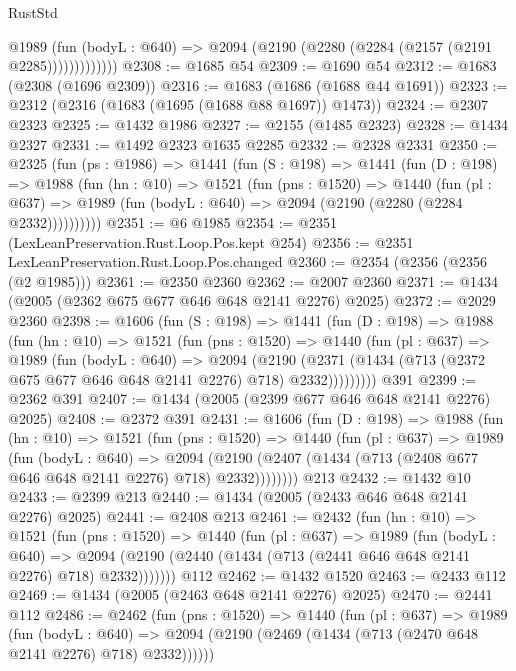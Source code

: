 \begin{lexlean}{RustStd}
\begin{coremodule}
                @1989
                  (fun (bodyL : @640) => @2094 (@2190 (@2280 (@2284 (@2157 (@2191 @2285)))))))))))))
@2308 := @1685 @54
@2309 := @1690 @54
@2312 := @1683 (@2308 (@1696 @2309))
@2316 := @1683 (@1686 (@1688 @44 @1691))
@2323 := @2312 (@2316 (@1683 (@1695 (@1688 @88 @1697)) @1473))
@2324 := @2307 @2323
@2325 := @1432 @1986
@2327 := @2155 (@1485 @2323)
@2328 := @1434 @2327
@2331 := @1492 @2323 @1635 @2285
@2332 := @2328 @2331
@2350 := @2325
    (fun (ps : @1986) =>
    @1441
      (fun (S : @198) =>
      @1441
        (fun (D : @198) =>
        @1988
          (fun (hn : @10) =>
          @1521
            (fun (pns : @1520) =>
            @1440
              (fun (pl : @637) =>
              @1989 (fun (bodyL : @640) => @2094 (@2190 (@2280 (@2284 @2332))))))))))
@2351 := @6 @1985
@2354 := @2351 (LexLeanPreservation.Rust.Loop.Pos.kept @254)
@2356 := @2351 LexLeanPreservation.Rust.Loop.Pos.changed
@2360 := @2354 (@2356 (@2356 (@2 @1985)))
@2361 := @2350 @2360
@2362 := @2007 @2360
@2371 := @1434 (@2005 (@2362 @675 @677 @646 @648 @2141 @2276) @2025)
@2372 := @2029 @2360
@2398 := @1606
    (fun (S : @198) =>
    @1441
      (fun (D : @198) =>
      @1988
        (fun (hn : @10) =>
        @1521
          (fun (pns : @1520) =>
          @1440
            (fun (pl : @637) =>
            @1989
              (fun (bodyL : @640) =>
              @2094
                (@2190
                  (@2371 (@1434 (@713 (@2372 @675 @677 @646 @648 @2141 @2276) @718) @2332)))))))))
    @391
@2399 := @2362 @391
@2407 := @1434 (@2005 (@2399 @677 @646 @648 @2141 @2276) @2025)
@2408 := @2372 @391
@2431 := @1606
    (fun (D : @198) =>
    @1988
      (fun (hn : @10) =>
      @1521
        (fun (pns : @1520) =>
        @1440
          (fun (pl : @637) =>
          @1989
            (fun (bodyL : @640) =>
            @2094 (@2190 (@2407 (@1434 (@713 (@2408 @677 @646 @648 @2141 @2276) @718) @2332))))))))
    @213
@2432 := @1432 @10
@2433 := @2399 @213
@2440 := @1434 (@2005 (@2433 @646 @648 @2141 @2276) @2025)
@2441 := @2408 @213
@2461 := @2432
    (fun (hn : @10) =>
    @1521
      (fun (pns : @1520) =>
      @1440
        (fun (pl : @637) =>
        @1989
          (fun (bodyL : @640) =>
          @2094 (@2190 (@2440 (@1434 (@713 (@2441 @646 @648 @2141 @2276) @718) @2332)))))))
    @112
@2462 := @1432 @1520
@2463 := @2433 @112
@2469 := @1434 (@2005 (@2463 @648 @2141 @2276) @2025)
@2470 := @2441 @112
@2486 := @2462
    (fun (pns : @1520) =>
    @1440
      (fun (pl : @637) =>
      @1989
        (fun (bodyL : @640) =>
        @2094 (@2190 (@2469 (@1434 (@713 (@2470 @648 @2141 @2276) @718) @2332))))))

\end{coremodule}
\end{lexlean}
